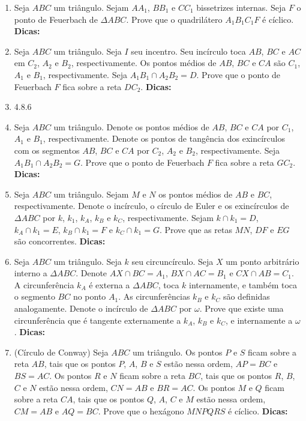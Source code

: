 \documentclass{article}
\newcommand{\dica}{\textbf{Dicas:}}
\newcommand{\iniTri}{Seja $ABC$ um triângulo}
\begin{document}
\begin{multicols}{2}
\begin{enumerate}
    \item \iniTri. Sejam $AA_1$, $BB_1$ e $CC_1$ bissetrizes internas. Seja $F$ o ponto de Feuerbach de $\Delta ABC$. Prove que o quadrilátero $A_1B_1C_1F$ é cíclico. \dica %
    
    \item \iniTri. Seja $I$ seu incentro. Seu incírculo toca $AB$, $BC$ e $AC$ em $C_2$, $A_2$ e $B_2$, respectivamente. Os pontos médios de $AB$, $BC$ e $CA$ são $C_1$, $A_1$ e $B_1$, respectivamente. Seja $A_1B_1\cap A_2B_2=D$. Prove que o ponto de Feuerbach $F$ fica sobre a reta $DC_2$. \dica %
    
    \item 4.8.6
    
    \item \iniTri. Denote os pontos médios de $AB$, $BC$ e $CA$ por $C_1$, $A_1$ e $B_1$, respectivamente. Denote os pontos de tangência dos exincírculos com os segmentos $AB$, $BC$ e $CA$ por $C_2$, $A_2$ e $B_2$, respectivamente. Seja $A_1B_1\cap A_2B_2=G$. Prove que o ponto de Feuerbach $F$ fica sobre a reta $GC_2$. \dica %
    
    \item \iniTri. Sejam $M$ e $N$ os pontos médios de $AB$ e $BC$, respectivamente. Denote o incírculo, o círculo de Euler e os exincírculos de $\Delta ABC$ por $k$, $k_1$, $k_A$, $k_B$ e $k_C$, respectivamente. Sejam $k\cap k_1=D$, $k_A\cap k_1=E$, $k_B\cap k_1=F$ e $k_C\cap k_1=G$. Prove que as retas $MN$, $DF$ e $EG$ são concorrentes. \dica %
    
    \item \iniTri. Seja $k$ seu circuncírculo. Seja $X$ um ponto arbitrário interno a $\Delta ABC$. Denote $AX\cap BC=A_1$, $BX\cap AC=B_1$ e $CX\cap AB=C_1$. A circunferência $k_A$ é externa a $\Delta ABC$, toca $k$ internamente, e também toca o segmento $BC$ no ponto $A_1$. As circunferências $k_B$ e $k_C$ são definidas analogamente. Denote o incírculo de $\Delta ABC$ por $\omega$. Prove que existe uma circunferência que é tangente externamente a $k_A$, $k_B$ e $k_C$, e internamente a $\omega$. \dica %
    
    \item (Círculo de Conway) \iniTri. Os pontos $P$ e $S$ ficam sobre a reta $AB$, tais que os pontos $P$, $A$, $B$ e $S$ estão nessa ordem, $AP=BC$ e $BS=AC$. Os pontos $R$ e $N$ ficam sobre a reta $BC$, tais que os pontos $R$, $B$, $C$ e $N$ estão nessa ordem, $CN=AB$ e $BR=AC$. Os pontos $M$ e $Q$ ficam sobre a reta $CA$, tais que os pontos $Q$, $A$, $C$ e $M$ estão nessa ordem, $CM=AB$ e $AQ=BC$. Prove que o hexágono $MNPQRS$ é cíclico. \dica %
    

\end{enumerate}
\end{multicols}
\end{document}
